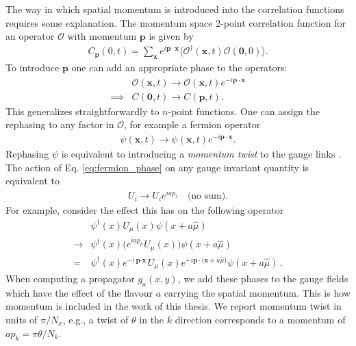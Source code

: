 The way in which spatial momentum is introduced into the correlation functions requires some explanation. The momentum space 2-point correlation function for an operator $\mathcal{O}$ with momentum ${\textbf{p}}$ is given by
\begin{align}
  C_{\textbf{p}}(0,t) = \sum_{{\textbf{x}}} e^{i{\textbf{p}}\cdot{\textbf{x}}} \langle \mathcal{O}^{\dagger} ({\textbf{x}},t) \mathcal{O}({\textbf{0}},0) \rangle.
\end{align}
To introduce ${\textbf{p}}$ one can add an appropriate phase to the operators:
\begin{align}
  \label{eq:phirephase}
  &\mathcal{O}({\textbf{x}},t) \rightarrow \mathcal{O}({\textbf{x}},t)e^{-i{\textbf{p}}\cdot{\textbf{x}}} \\
  \implies &C({\textbf{0}},t) \rightarrow C({\textbf{p}},t).
\end{align}
This generalizes straightforwardly to $n$-point functions. One can assign the rephasing to any factor in $\mathcal{O}$, for example a fermion operator
\begin{align}
  \psi({\textbf{x}},t) \rightarrow \psi({\textbf{x}},t)e^{-i{\textbf{p}}\cdot{\textbf{x}}}.
  \label{eq:fermion_phase}
\end{align}
Rephasing $\psi$ is equivalent to introducing a {\it{momentum twist}} to the gauge links \cite{Guadagnoli:2005be}. The action of Eq. \eqref{eq:fermion_phase} on any gauge invariant quantity is equivalent to
\begin{align}
  U_i \rightarrow U_i e^{iap_i}\quad\text{(no sum)}.
  \label{eq:twist}
\end{align}
For example, consider the effect this has on the following operator
\begin{align}
  \nonumber
  &\psi^{\dagger}(x) U_{\mu}(x) \psi(x+a\hat{\mu}) \\
  \nonumber
  \rightarrow &\psi^{\dagger}(x) \big( e^{iap_{\mu}}U_{\mu}(x) \big) \psi(x+a\hat{\mu})
  \\
  = &\psi^{\dagger}(x)e^{-i{\textbf{p}\cdot\textbf{x}}}U_{\mu}(x) e^{+i{\textbf{p}\cdot(\textbf{x}}+a\hat{\mu})}\psi(x+a\hat{\mu})\,.
\end{align}
When computing a propagator $g_a(x,y)$, we add these phases to the gauge fields which have the effect of the flavour $a$ carrying the spatial momentum. This is how momentum is included in the work of this thesis. We report momentum twist in units of $\pi/N_x$, e.g., a twist of $\theta$ in the $k$ direction corresponds to a momentum of $ap_k = \pi\theta/N_k$.

